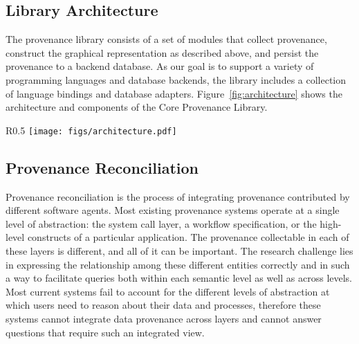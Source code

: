 \documentclass[10pt]{article}
\begin{document}
\subsection{Library Architecture}

The provenance library consists of a set of modules that collect provenance,
construct the graphical representation as described above, and persist the
provenance to a backend database.
As our goal is to support a variety of programming languages and database
backends, the library includes a collection of language bindings and
database adapters.
Figure~\ref{fig:architecture} shows the architecture and components of the
Core Provenance Library.

\begin{wrapfigure}{R}{0.5\textwidth}
\vspace{-30pt}
\texttt{[image: figs/architecture.pdf]}
\label{fig:architecture}
\vspace{-20pt}
\caption{\small{Core Provenance Library Architecture.  The databases and language}
adapters shown in bold are ones that are needed for our applications.}
\vspace{-10pt}
\end{wrapfigure}

\subsection{Provenance Reconciliation} 
\label{sec:reconcile}

Provenance reconciliation is the process of integrating provenance contributed
by different software agents.
Most existing provenance systems operate at a single level of abstraction:
the system call layer, a workflow specification, or the
high-level constructs of a particular application.
The provenance collectable in each of these layers is
different, and all of it can be important.
The research challenge lies in expressing the relationship among these
different entities correctly and in such a way to facilitate queries
both within each semantic level as well as across levels.
Most current systems fail to account for the different levels of
abstraction at which users need to reason about their data and
processes, therefore these systems cannot integrate data provenance across
layers and cannot answer questions that require such an integrated view.
\end{document}
